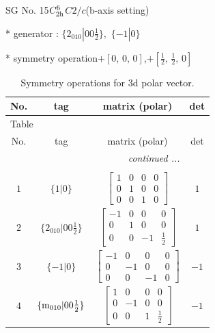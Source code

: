 \documentclass[fleqn,8pt]{jsarticle}
\begin{document}
\setcounter{MaxMatrixCols}{32}

\renewcommand{\tablename}{Table~}
\renewcommand{\figurename}{Figure~}
\begin{center}
\LARGE
SG No. 15\quad$C_{\rm 2h}^{6}$\quad$C2/c$\quad(b-axis setting)\quad[ monoclinic ]
\end{center}

* generator : $\{2{}_{010}|0 0 \frac{1}{2}\},\,\,\{-1|0\}$

* symmetry operation\quad$+\left[ 0,\, 0,\, 0 \right]$,\quad $+\left[ \frac{1}{2},\, \frac{1}{2},\, 0 \right]$
\renewcommand{\arraystretch}{1.3}
\begin{longtable}{cccc}
\caption{Symmetry operations for 3d polar vector.}
 \\
 \hline \hline
No. & tag & matrix (polar) & det \\ \hline \endfirsthead

\multicolumn{3}{l}{\tablename\ \thetable{}} \\
 \hline \hline
No. & tag & matrix (polar) & det \\ \hline \endhead

 \hline \hline
\multicolumn{3}{r}{\footnotesize\it continued ...} \\ \endfoot

 \hline \hline
\multicolumn{3}{r}{} \\ \endlastfoot

$ 1 $ & $ \{1|0\} $ & $ \begin{bmatrix} 1 & 0 & 0 & 0 \\ 0 & 1 & 0 & 0 \\ 0 & 0 & 1 & 0 \end{bmatrix} $ & $ 1 $ \\ \hline
$ 2 $ & $ \{2{}_{010}|0 0 \frac{1}{2}\} $ & $ \begin{bmatrix} -1 & 0 & 0 & 0 \\ 0 & 1 & 0 & 0 \\ 0 & 0 & -1 & \frac{1}{2} \end{bmatrix} $ & $ 1 $ \\ \hline
$ 3 $ & $ \{-1|0\} $ & $ \begin{bmatrix} -1 & 0 & 0 & 0 \\ 0 & -1 & 0 & 0 \\ 0 & 0 & -1 & 0 \end{bmatrix} $ & $ -1 $ \\ \hline
$ 4 $ & $ \{{\rm m}_{010}|0 0 \frac{1}{2}\} $ & $ \begin{bmatrix} 1 & 0 & 0 & 0 \\ 0 & -1 & 0 & 0 \\ 0 & 0 & 1 & \frac{1}{2} \end{bmatrix} $ & $ -1 $ \\
\end{longtable}
\end{document}
